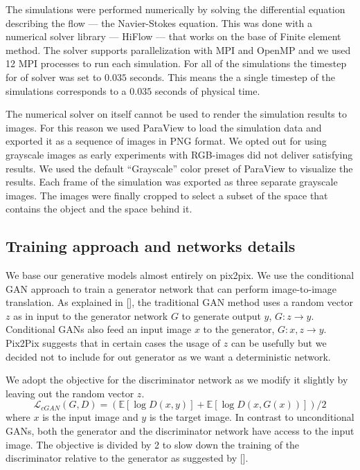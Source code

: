 \documentclass{llncs}
\begin{document}
The simulations were performed numerically by solving the differential equation describing the flow --- the Navier-Stokes equation. This was done with a numerical solver library --- HiFlow ---  that works on the base of Finite element method. The solver supports parallelization with MPI and OpenMP and we used 12 MPI processes to run each simulation. For all of the simulations the timestep for of solver was set to $0.035$ seconds. This means the a single timestep of the simulations corresponds to a $0.035$ seconds of physical time.

The numerical solver on itself cannot be used to render the simulation results to images. For this reason we used ParaView to load the simulation data and exported it as a sequence of images in PNG format. We opted out for using grayscale images as early experiments with RGB-images did not deliver satisfying results. We used the default ``Grayscale'' color preset of ParaView to visualize the results. Each frame of the simulation was exported as three separate grayscale images. The images were finally cropped to select a subset of the space that contains the object and the space behind it.

\subsection{Training approach and networks details}
We base our generative models almost entirely on pix2pix. We use the conditional GAN approach to train a generator network that can perform image-to-image translation. As explained in [], the traditional GAN method uses a random vector $z$ as in input to the generator network $G$ to generate output $y$, $G:z \rightarrow y$. Conditional GANs also feed an input image $x$ to the generator, $G: x,z \rightarrow y$. Pix2Pix suggests that in certain cases the usage of $z$ can be usefully but we decided not to include for out generator as we want a deterministic network.

We adopt the objective for the discriminator network as we modify it slightly by leaving out the random vector $z$.
\begin{equation}
\mathcal{L}_{cGAN} (G, D) = (\mathbb{E}[\log D (x,y)] + \mathbb{E}[\log D (x, G(x))])/2
\end{equation}
where $x$ is the input image and $y$ is the target image. In contrast to unconditional GANs, both the generator and the discriminator network have access to the input image. The objective is divided by 2 to slow down the training of the discriminator relative to the generator as suggested by [].
\end{document}
